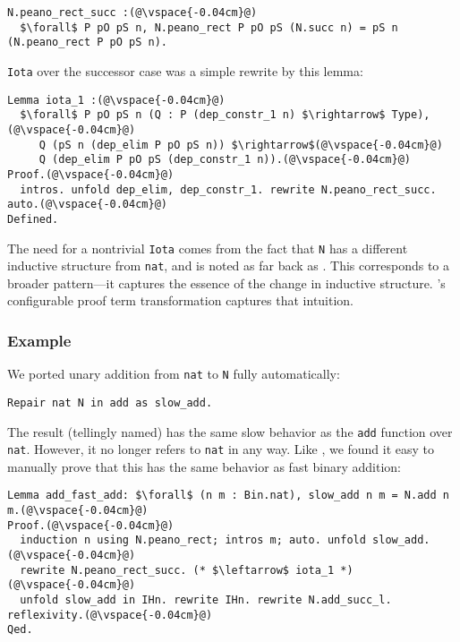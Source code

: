 \begin{lstlisting}
N.peano_rect_succ :(@\vspace{-0.04cm}@)
  $\forall$ P pO pS n, N.peano_rect P pO pS (N.succ n) = pS n (N.peano_rect P pO pS n).
\end{lstlisting}
\lstinline{Iota} over the successor case was a simple rewrite by this lemma:

\begin{lstlisting}
Lemma iota_1 :(@\vspace{-0.04cm}@)
  $\forall$ P pO pS n (Q : P (dep_constr_1 n) $\rightarrow$ Type),(@\vspace{-0.04cm}@)
     Q (pS n (dep_elim P pO pS n)) $\rightarrow$(@\vspace{-0.04cm}@)
     Q (dep_elim P pO pS (dep_constr_1 n)).(@\vspace{-0.04cm}@)
Proof.(@\vspace{-0.04cm}@)
  intros. unfold dep_elim, dep_constr_1. rewrite N.peano_rect_succ. auto.(@\vspace{-0.04cm}@)
Defined.
\end{lstlisting}

The need for a nontrivial \lstinline{Iota} comes from the fact that \lstinline{N} has a different
inductive structure from \lstinline{nat}, and is noted as far back as \citet{magaud2000changing}.
This corresponds to a broader pattern---it captures the essence of the change in inductive structure.
\toolname's configurable proof term transformation captures that intuition.

\subsubsection{Example}

We ported unary addition from \lstinline{nat} to \lstinline{N} fully automatically:

\begin{lstlisting}
Repair nat N in add as slow_add.
\end{lstlisting}
The result (tellingly named) has the same slow behavior as the \lstinline{add} function over \lstinline{nat}.
However, it no longer refers to \lstinline{nat} in any way.
Like \citet{magaud2000changing}, we found it easy to manually prove that
this has the same behavior as fast binary addition:

\begin{lstlisting}
Lemma add_fast_add: $\forall$ (n m : Bin.nat), slow_add n m = N.add n m.(@\vspace{-0.04cm}@)
Proof.(@\vspace{-0.04cm}@)
  induction n using N.peano_rect; intros m; auto. unfold slow_add.(@\vspace{-0.04cm}@)
  rewrite N.peano_rect_succ. (* $\leftarrow$ iota_1 *)(@\vspace{-0.04cm}@)
  unfold slow_add in IHn. rewrite IHn. rewrite N.add_succ_l. reflexivity.(@\vspace{-0.04cm}@)
Qed.
\end{lstlisting}

